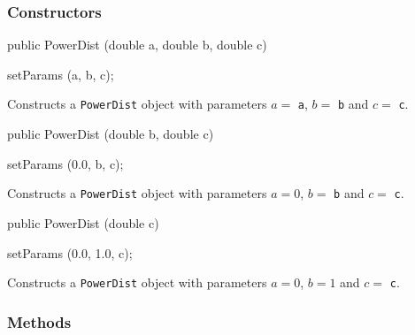 \subsubsection* {Constructors}

\begin{code}

   public PowerDist (double a, double b, double c)\begin{hide} {
      setParams (a, b, c);
   }\end{hide}
\end{code}
\begin{tabb} Constructs a \texttt{PowerDist} object with parameters
     $a =$ \texttt{a}, $b =$ \texttt{b} and $c =$ \texttt{c}.
 \end{tabb}
\begin{code}

   public PowerDist (double b, double c)\begin{hide} {
      setParams (0.0, b, c);
   }\end{hide}
\end{code}
\begin{tabb} Constructs a \texttt{PowerDist} object with parameters
     $a = 0$, $b =$ \texttt{b} and $c =$ \texttt{c}.
 \end{tabb}
\begin{code}

   public PowerDist (double c)\begin{hide} {
      setParams (0.0, 1.0, c);
   }\end{hide}
\end{code}
\begin{tabb} Constructs a \texttt{PowerDist} object with parameters
     $a = 0$, $b =1$ and $c =$ \texttt{c}.
 \end{tabb}


\subsubsection* {Methods}

